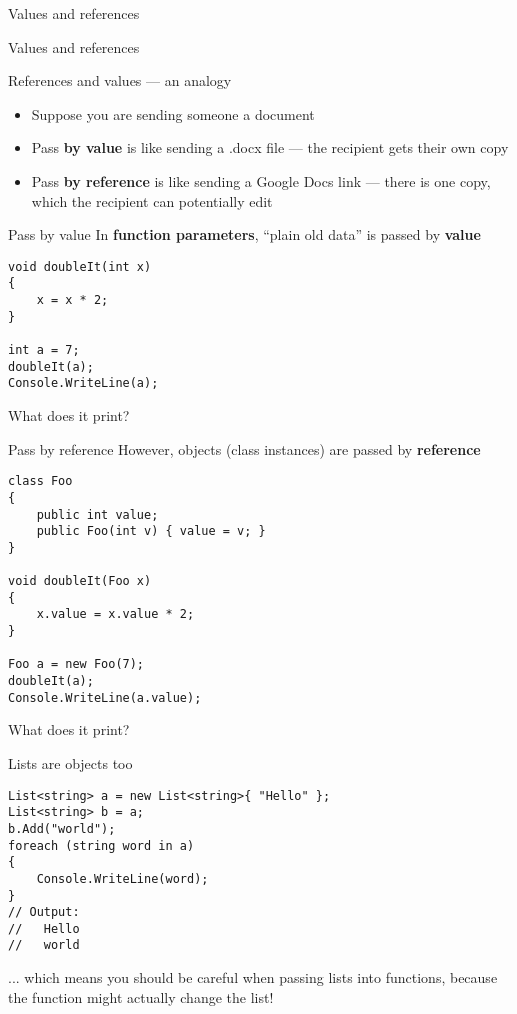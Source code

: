 \begin{frame}{Values and references}
	\socrative
	
\end{frame}

\begin{frame}{Values and references}
	\socrative
	
\end{frame}

\begin{frame}{References and values --- an analogy}
	\begin{itemize}
		\pause\item Suppose you are sending someone a document
		\pause\item Pass \textbf{by value} is like sending a .docx file --- the recipient gets their own copy
		\pause\item Pass \textbf{by reference} is like sending a Google Docs link --- there is one copy, which the recipient can potentially edit
	\end{itemize}
\end{frame}

\begin{frame}[fragile]{Pass by value}
	\socrative
	In \textbf{function parameters},
	``plain old data'' is passed by \textbf{value}
	\pause
	\begin{lstlisting}
void doubleIt(int x)
{
	x = x * 2;
}

int a = 7;
doubleIt(a);
Console.WriteLine(a);
	\end{lstlisting}
	\pause
	What does it print?
\end{frame}

\begin{frame}[fragile]{Pass by reference}
	\socrative
	However, objects (class instances) are passed by \textbf{reference}
	\pause
	\begin{lstlisting}
class Foo
{
	public int value;
	public Foo(int v) { value = v; }
}

void doubleIt(Foo x)
{
    x.value = x.value * 2;
}

Foo a = new Foo(7);
doubleIt(a);
Console.WriteLine(a.value);
	\end{lstlisting}
	\pause
	What does it print?
\end{frame}

\begin{frame}[fragile]{Lists are objects too}
	\pause
	\begin{lstlisting}
List<string> a = new List<string>{ "Hello" };
List<string> b = a;
b.Add("world");
foreach (string word in a)
{
	Console.WriteLine(word);
}
// Output:
//   Hello
//   world
\end{lstlisting}
	\pause
	... which means you should be careful when passing lists into functions,
	because the function might actually change the list!
\end{frame}

